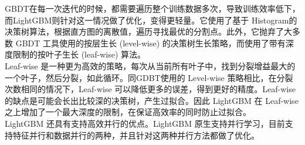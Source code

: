 GBDT在每一次迭代的时候，都需要遍历整个训练数据多次，导致训练效率低下，而LightGBM则针对这一情况做了优化，变得更轻量。它使用了基于 Histogram的决策树算法，根据直方图的离散值，遍历寻找最优的分割点。此外，它抛弃了大多数 GBDT 工具使用的按层生长 (level-wise) 的决策树生长策略，而使用了带有深度限制的按叶子生长 (leaf-wise) 算法。\\

Leaf-wise 是一种更为高效的策略，每次从当前所有叶子中，找到分裂增益最大的一个叶子，然后分裂，如此循环。同GDBT使用的 Level-wise 策略相比，在分裂次数相同的情况下，Leaf-wise 可以降低更多的误差，得到更好的精度。Leaf-wise 的缺点是可能会长出比较深的决策树，产生过拟合。因此 LightGBM 在 Leaf-wise 之上增加了一个最大深度的限制，在保证高效率的同时防止过拟合。\\

LightGBM 还具有支持高效并行的优点。LightGBM 原生支持并行学习，目前支持特征并行和数据并行的两种，并且针对这两种并行方法都做了优化。\\

